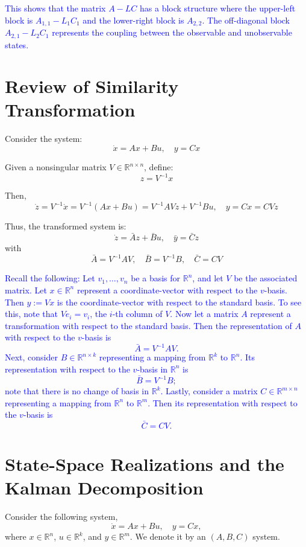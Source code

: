 \documentclass{article}
\begin{document}
\textcolor{blue}{This shows that the matrix \(A - LC\) has a block structure where the upper-left block is \(A_{1,1} - L_1 C_1\) and the lower-right block is \(A_{2,2}\). The off-diagonal block \(A_{2,1} - L_2 C_1\) represents the coupling between the observable and unobservable states.}

\section{Review of Similarity Transformation}

Consider the system:
\[
\dot{x} = Ax + Bu, \quad y = Cx
\]

Given a nonsingular matrix \( V \in \mathbb{R}^{n \times n} \), define:
\[
z = V^{-1}x
\]

Then,
\[
\dot{z} = V^{-1} \dot{x} = V^{-1}(Ax + Bu) = V^{-1}AVz + V^{-1}Bu, \quad y = Cx = CVz
\]

Thus, the transformed system is:
\[
\dot{z} = \bar{A}z + \bar{B}u, \quad \bar{y} = \bar{C}z
\]
with
\[
\bar{A} = V^{-1}AV, \quad \bar{B} = V^{-1}B, \quad \bar{C} = CV
\]

\textcolor{blue}{
Recall the following:
Let \( v_1, \ldots, v_n \) be a basis for \( \mathbb{R}^n \), and let \( V \) be the associated matrix.
Let \( x \in \mathbb{R}^n \) represent a coordinate-vector with respect to the \( v \)-basis.
Then \( y := Vx \) is the coordinate-vector with respect to the standard basis.
To see this, note that \( V e_i = v_i \), the \( i \)-th column of \( V \).
Now let a matrix \( A \) represent a transformation with respect to the standard basis. Then the
representation of \( A \) with respect to the \( v \)-basis is
\[
\bar{A} = V^{-1}AV.
\]
Next, consider \( B \in \mathbb{R}^{n \times k} \) representing a mapping from \( \mathbb{R}^k \) to \( \mathbb{R}^n \). Its representation with respect
to the \( v \)-basis in \( \mathbb{R}^n \) is
\[
\bar{B} = V^{-1}B;
\]
note that there is no change of basis in \( \mathbb{R}^k \).
Lastly, consider a matrix \( C \in \mathbb{R}^{m \times n} \) representing a mapping from \( \mathbb{R}^n \) to \( \mathbb{R}^m \). Then its representation with respect to the \( v \)-basis is
\[
\bar{C} = CV.
\]
}

\section{State-Space Realizations and the Kalman Decomposition}

Consider the following system,
\[
\dot{x} = Ax + Bu, \quad y = Cx,
\]
where \( x \in \mathbb{R}^n \), \( u \in \mathbb{R}^k \), and \( y \in \mathbb{R}^m \).
We denote it by an \((A, B, C)\) system.
\end{document}
